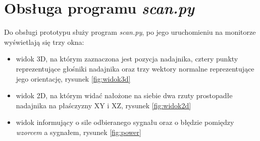 \section{Obsługa programu \textit{scan.py}}

Do obsługi prototypu służy program \textit{scan.py}, po jego uruchomieniu 
na monitorze wyświetlają się trzy okna: 
\begin{itemize}
 \item widok 3D, na którym zaznaczona jest 
pozycja nadajnika, cztery punkty reprezentujące głośniki nadajnika oraz trzy wektory normalne reprezentujące 
jego orientację, rysunek \ref{fig:widok3d}
 \item widok 2D, na którym widać nałożone na siebie dwa rzuty prostopadłe nadajnika na płaśczyzny XY i XZ, rysunek \ref{fig:widok2d}
 \item widok informujący o sile odbieranego sygnału oraz o błędzie pomiędzy \textit{wzorcem} a sygnałem, rysunek \ref{fig:power}
\end{itemize}


